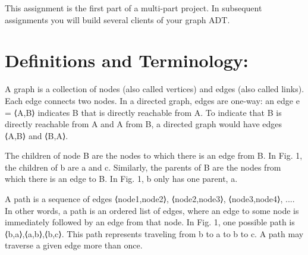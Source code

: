 \documentclass[11pt]{article}
\begin{document}
\noindent This assignment is the first part of a multi-part project. In subsequent assignments you will build several clients of your graph ADT.
\newpage
{}
\newline
\section*{Definitions and Terminology:}
\label{sec:Definitions and Terminology}

A graph is a collection of nodes (also called vertices) and edges (also called links). Each edge connects two nodes. In a directed graph, edges are one-way: an edge e = ⟨A,B⟩ indicates B that is directly reachable from A. To indicate that B is directly reachable from A and A from B, a directed graph would have edges ⟨A,B⟩ and ⟨B,A⟩.


\noindent The children of node B are the nodes to which there is an edge from B. In Fig. 1, the children of b are a and c. Similarly, the parents of B are the nodes from which there is an edge to B. In Fig. 1, b only has one parent, a.

\noindent A path is a sequence of edges ⟨node1,node2⟩, ⟨node2,node3⟩, ⟨node3,node4⟩, .... In other words, a path is an ordered list of edges, where an edge to some node is immediately followed by an edge from that node. In Fig. 1, one possible path is ⟨b,a⟩,⟨a,b⟩,⟨b,c⟩. This path represents traveling from b to a to b to c. A path may traverse a given edge more than once.
\end{document}
